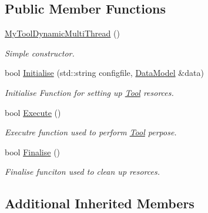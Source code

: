 \subsection*{Public Member Functions}
\begin{DoxyCompactItemize}
\item 
\hypertarget{classMyToolDynamicMultiThread_a5eec7239400c507754ba6218b3eb8d4a}{\hyperlink{classMyToolDynamicMultiThread_a5eec7239400c507754ba6218b3eb8d4a}{My\-Tool\-Dynamic\-Multi\-Thread} ()}\label{classMyToolDynamicMultiThread_a5eec7239400c507754ba6218b3eb8d4a}

\begin{DoxyCompactList}\small\item\em Simple constructor. \end{DoxyCompactList}\item 
bool \hyperlink{classMyToolDynamicMultiThread_ac082408d85bc3e76214e55d4f62de0da}{Initialise} (std\-::string configfile, \hyperlink{classDataModel}{Data\-Model} \&data)
\begin{DoxyCompactList}\small\item\em Initialise Function for setting up \hyperlink{classTool}{Tool} resorces. \end{DoxyCompactList}\item 
\hypertarget{classMyToolDynamicMultiThread_aec2f9af9495520d74bb154d626a94a63}{bool \hyperlink{classMyToolDynamicMultiThread_aec2f9af9495520d74bb154d626a94a63}{Execute} ()}\label{classMyToolDynamicMultiThread_aec2f9af9495520d74bb154d626a94a63}

\begin{DoxyCompactList}\small\item\em Executre function used to perform \hyperlink{classTool}{Tool} perpose. \end{DoxyCompactList}\item 
\hypertarget{classMyToolDynamicMultiThread_ab70e77b0fd90e50c5103ccfa0bfd6485}{bool \hyperlink{classMyToolDynamicMultiThread_ab70e77b0fd90e50c5103ccfa0bfd6485}{Finalise} ()}\label{classMyToolDynamicMultiThread_ab70e77b0fd90e50c5103ccfa0bfd6485}

\begin{DoxyCompactList}\small\item\em Finalise funciton used to clean up resorces. \end{DoxyCompactList}\end{DoxyCompactItemize}
\subsection*{Additional Inherited Members}


